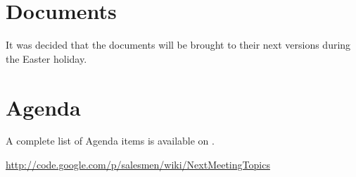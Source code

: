 \documentclass[a4paper, 12pt]{article}
\begin{document}
	\section{Documents}
		It was decided that the documents will be brought to their next versions during the Easter holiday.
	
	\section{Agenda}
A complete list of Agenda items is available on \cite{agendaitems}.\\
	
	\begin{thebibliography}{99}
		
		\href{http://code.google.com/p/salesmen/wiki/NextMeetingTopics}{http://code.google.com/p/salesmen/wiki/NextMeetingTopics}
		
	\end{thebibliography}	
		
\end{document}
